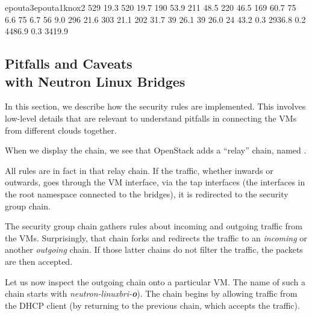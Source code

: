 \noindent%
\resultpartition%
{{epouta3}{epouta1}{knox2}}%
{{ 529 }{ 19.3   }{ 520 }{ 19.7   }{ 190 }{ 53.9   }}%
{{ 211 }{ 48.5   }{ 220 }{ 46.5   }{ 169 }{ 60.7   }}%
{{  75 }{  6.6   }{  75 }{  6.7   }{  56 }{  9.0   }}%
{{ 296 }{ 21.6   }{ 303 }{ 21.1   }{ 202 }{ 31.7   }}%
{{  39 }{ 26.1   }{  39 }{ 26.0   }{  24 }{ 43.2   }}%
{{ 0.3 }{ 2936.8 }{ 0.2 }{ 4486.9 }{ 0.3 }{ 3419.9 }}


\subsection{Pitfalls and Caveats\\with Neutron Linux Bridges}
\label{appendix:secgroups}


In this section, we describe how the security rules are
implemented. This involves low-level details that are relevant to
understand pitfalls in connecting the VMs from different clouds
together.

When we display the  chain, we see that OpenStack adds a
``relay'' chain, named .


All rules are in fact in that relay chain. If the traffic, whether
inwards or outwards, goes through the VM interface, via the tap
interfaces (\ie the interfaces in the root namespace connected to the
bridges), it is redirected to the security group chain.


The security group chain gathers rules about incoming and outgoing
traffic from the VMs. Surprisingly, that chain forks and redirects the
traffic to an \emph{incoming} or another \emph{outgoing} chain. If
those latter chains do not filter the traffic, the packets are then
accepted.


Let us now inspect the outgoing chain onto a particular VM. The name
of such a chain starts with \emph{neutron-linuxbri-\textbf{o}}). The
chain begins by allowing traffic from the DHCP client (by returning to
the previous chain, which accepts the traffic).

